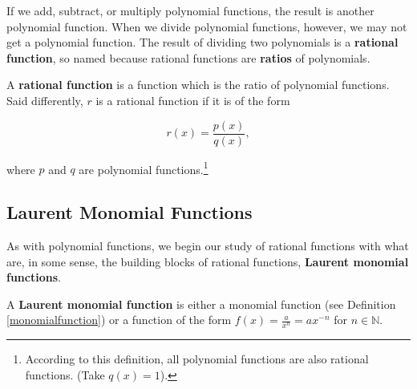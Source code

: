 \documentclass{ximera}
\begin{document}
	\author{Stitz-Zeager}


\setcounter{footnote}{0}

\label{IntroRational}


If we add, subtract, or multiply polynomial functions, the result is another polynomial function.  When we divide polynomial functions, however, we may not get a polynomial function.   The result of dividing two polynomials is a    \textbf{rational function}, so named because rational functions  are \textbf{ratios} of polynomials.




\begin{definition}  \label{rationalfunction} A \textbf{rational function} is a function which is the ratio of polynomial functions.  Said differently, $r$ is a rational function if it is of the form 

\[ r(x) = \frac{p(x)}{q(x)},\]

where $p$ and $q$ are polynomial functions.\footnote{According to this definition, all polynomial functions are also  rational functions. (Take $q(x) = 1$).}

\end{definition}


\subsection{Laurent Monomial Functions}
\label{LaurentMonomialFunctionsSection}

As with polynomial functions, we begin our study of rational functions with what are, in some sense, the building blocks of rational functions, \textbf{Laurent monomial functions}.  


\begin{definition}  \label{laurentmonomialfunction} A \textbf{Laurent monomial function} is either a monomial function (see Definition \ref{monomialfunction}) or a function of the form $f(x) = \frac{a}{x^n} = ax^{-n}$ for $n \in \mathbb{N}$.

\end{definition}
\end{document}
